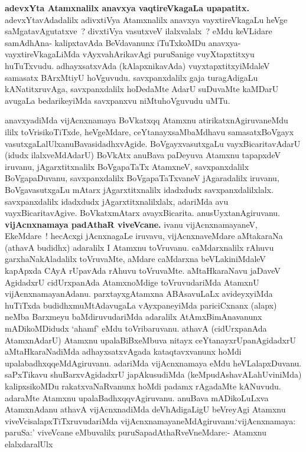 \begin{artha}
\textbf{adevxYta Atamxnalilx anavxya vaqtireVkagaLa upapatitx.}
adevxYtavAdadalilx adivxtiVya Atamxnalilx anavxya vayxtireVkagaLu heVge saMgatavAgutatxve~? divxtiVya vasutxveV ilalxvalalx~? eMdu keVLidare
samAdhAna- kalipxtavAda BeVdavanunx iTuTxkoMDu anavxya-
vayxtireVkagaLiMda vAyxvahArikavAgi puruSanige vuyXtapxtitxyu
huTuTxvudu. adhayxsatxvAda (kAlapxnikavAda) vuyxtapxtitxyiMdaleV
samasatx BArxMtiyU hoVguvudu. savxpanxdalilx gaja turagAdigaLu
kANatitxruvAga, savxpanxdalilx hoDedaMte AdarU suDuvaMte kaMDarU
avugaLa bedarikeyiMda savxpanxvu niMtuhoVguvudu uMTu.
\end{artha}

\begin{artha}
anavxyadiMda vijAcnxnamaya BoVkatxqq Atamxnu atirikatxnAgiruvaneMdu ililx
toVrisikoTiTxde, heVgeMdare, ceYtanayxsaMbaMdhavu samasatxBoVgayx
vasutxgaLalUlx\break anuBavasidadhxvAgide. BoVgayxvasutxgaLu
vayxBicaritavAdarU (idudx ilalxveMdAdarU) BoVkAtx anuBava paDeyuva
Atamxnu tapapxdeV iruvanu, jAgarxtitxnalilx BoVgapaTaTx AtamxneV,
savxpanxdalilx BoVgapaDuvanu, savxpanxdalilx BoVgapaTaTxvaneV
jAgaradalilx iruvanu, BoVgavasutxgaLu mAtarx jAgarxtitxnalilx
idadxdudx savxpanxdalilxlalx. savxpanxdalilx idadxdudx jAgarxtitxnalilxlalx,
adariMda avu vayxBicaritavAgive. BoVkatxmAtarx avayxBicarita.
anusUyxtanAgiruvanu. \textbf{vijAcnxnamaya padAthaR viveVcane.} ivanu
vijAcnxnamayaneV, EkeMdare~! hecAcxgi jAcnxnagaLe iruvavu,
vijAcnxnaveMdare aMtakaraNa (athavA budidhx) adaralilx I Atamxnu
toVruvanu. caMdarxnalilx rAhuvu garxhaNakAladalilx toVruvaMte, aMdare
caMdarxna beVLakiniMdaleV kapApxda CAyA rUpavAda
rAhuvu toVruvaMte. aMtaHkaraNavu jaDaveV AgidadxrU cidUrxpanAda
AtamxnoMdige toVruvudariMda AtamxnU
vijAcnxnamayanAdanu. parxtayxgAtamxna ABAsavuLaLx avideyxyiMda
huTiTxda budidhxmuMtAdavugaLa vAyxpaneyiMda pariciCxnanx (alapx) neMba
Barxmeyu baMdiruvudariMda adaralilx AtAmxBimAnavanunx mADikoMDidudx
`ahamf' eMdu toVribaruvanu. athavA (cidUrxpanAda AtamxnAdarU) Atamxnu
upalaBiBxeMbuva nitayx ceYtanayxrUpanAgidadxrU aMtaHkaraNadiMda
adhayxsatxvAgada kataqtavxvanunx hoMdi upalabadhxqqeMdAgiruvanu.
adariMda vijAcnxnamaya eMdu heVLalapxDuvanu. saPxTikavu
shuBarxvAgidadxrU japAkusudiMda (keMpudAshavALa\break hUviniMda) kalipxsikoMDu
rakatxvaNaRvanunx hoMdi padamx rAgadaMte kANuvudu. adaraMte Atamxnu
upalaBadhxqqvAgiruvanu. anuBava mADikoLuLxva AtamxnAdanu athavA
vijAcnxnadiMda deVhAdigaLigU beVreyAgi Atamxnu
viveVcisalapxTiTxruvudariMda
vijAcnxnamayaneMdAgiruvanu.`vijAcnxnamaya: paruSa:'
viveVcane eMbuvalilx puruSapadAthaRveVneMdare:- Atamxnu elalxdaralUlx

\end{artha}
